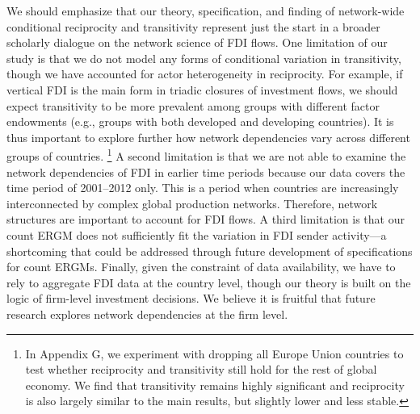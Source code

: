 \documentclass[reqno,onecolumn,letterpaper,12pt]{article}
\begin{document}
We should emphasize that our theory, specification, and finding of network-wide conditional reciprocity and transitivity represent just the start in a broader scholarly dialogue on the network science of FDI flows. One limitation of our study is that we do not model any forms of conditional variation in transitivity, though we have accounted for actor heterogeneity in reciprocity.  %
For example, if vertical FDI is the main form in triadic closures of investment flows, we should expect transitivity to be more prevalent among groups with different factor endowments (e.g., groups with both developed and developing countries). It is thus important to explore further how network dependencies vary across different groups of countries. \footnote{In Appendix G, we experiment with dropping all Europe Union countries to test whether reciprocity and transitivity still hold for the rest of global economy. We find that transitivity remains highly significant and reciprocity is also largely similar to the main results, but slightly lower and less stable. }
A second limitation is that we are not able to examine the network dependencies of FDI in earlier time periods because our data covers the time period of 2001--2012 only. This is a period when countries are increasingly interconnected by complex global production networks. Therefore, network structures are important to account for FDI flows. A third limitation is that our count ERGM does not sufficiently fit the variation in FDI sender activity---a shortcoming that could be addressed through future development of specifications for count ERGMs. Finally, given the constraint of data availability, we have to rely to aggregate FDI data at the country level, though our theory is built on the logic of firm-level investment decisions. We believe it is fruitful that future research explores network dependencies at the firm level.
\end{document}
